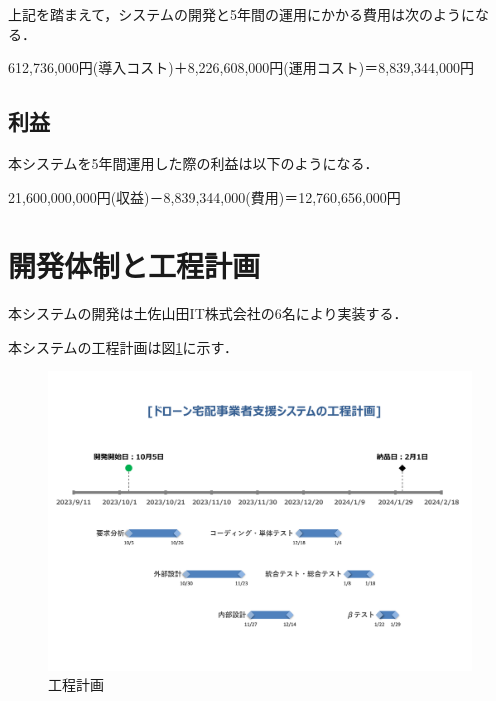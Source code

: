 \documentclass[a4paper, titlepage]{jsarticle}
\begin{document}
上記を踏まえて，システムの開発と5年間の運用にかかる費用は次のようになる．
\begin{center}
        612,736,000円(導入コスト)＋8,226,608,000円(運用コスト)＝8,839,344,000円
\end{center}

\subsection{利益}
本システムを5年間運用した際の利益は以下のようになる．
\begin{center}
        21,600,000,000円(収益)－8,839,344,000(費用)＝12,760,656,000円
\end{center}

\section{開発体制と工程計画}
本システムの開発は土佐山田IT株式会社の6名により実装する．

本システムの工程計画は図\ref{scadule}に示す．
\begin{figure}[htbp]
        \label{scadule}
        \centering
        \includegraphics[width=15cm]{scadule.pdf}
        \caption{工程計画}
\end{figure}
\end{document}
